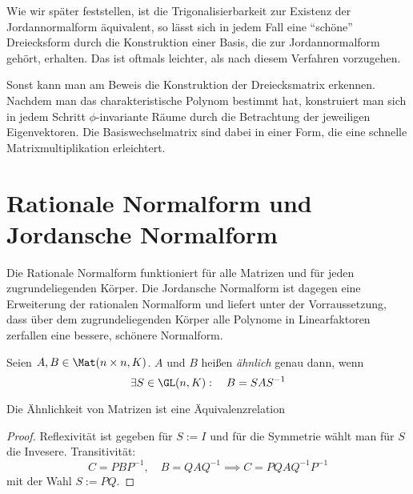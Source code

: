\documentclass[a4paper, 10pt]{scrbook}
\begin{document}
\begin{note}
Wie wir später feststellen, ist die Trigonalisierbarkeit zur Existenz der Jordannormalform äquivalent, so lässt sich in jedem Fall eine "`schöne"' Dreiecksform durch die Konstruktion einer Basis, die zur Jordannormalform gehört, erhalten.
Das ist oftmals leichter, als nach diesem Verfahren vorzugehen.

Sonst kann man am Beweis die Konstruktion der Dreiecksmatrix erkennen. Nachdem man das charakteristische Polynom bestimmt hat, konstruiert man sich in jedem Schritt $\phi$-invariante Räume durch die Betrachtung der jeweiligen Eigenvektoren.  Die Basiswechselmatrix sind dabei in einer Form, die eine schnelle Matrixmultiplikation erleichtert.
\end{note}



\chapter{Rationale Normalform und Jordansche Normalform}

Die Rationale Normalform funktioniert für alle Matrizen und für jeden zugrundeliegenden Körper.
Die Jordansche Normalform ist dagegen eine Erweiterung der rationalen Normalform und liefert unter der Vorraussetzung, dass über dem zugrundeliegenden Körper alle Polynome in Linearfaktoren zerfallen eine bessere, schönere Normalform.

\begin{df}
\label{df:12.1}
Seien $A,B\in \Mat(n\times n,K)$.
$A$ und $B$ heißen \emph{ähnlich} genau dann, wenn
\[
\exists S\in \GL(n,K):\quad B=SAS^{-1}
\]
\begin{note}
	Die Ähnlichkeit von Matrizen ist eine Äquivalenzrelation
	\begin{proof}
		Reflexivität ist gegeben für $S:=I$ und für die Symmetrie wählt man für $S$ die Invesere.
		Transitivität:
		\[
			C = PBP^{-1}, \quad B= QAQ^{-1} \implies C = PQAQ^{-1}P^{-1}
		\]
		mit der Wahl $S:= PQ$.
	\end{proof}
\end{note}
\end{df}
\end{document}
